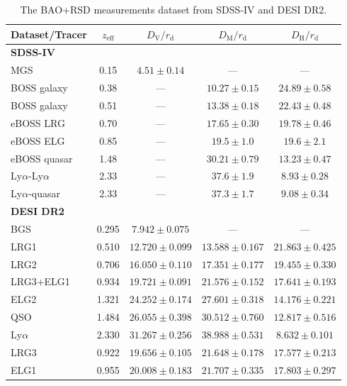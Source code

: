 \documentclass[twocolumn]{aastex631}
\begin{document}
   \begin{table}
      \centering
      \begin{tabular}{l|cccc}
         \hline\hline
         Dataset/Tracer & $z_{\text{eff}}$ & $D_{\text{V}}/r_{\text{d}}$ & 
         $D_{\text{M}}/r_{\text{d}}$ & $D_{\text{H}}/r_{\text{d}}$ \\
         \hline
         \textbf{SDSS-IV} \\
         MGS & 0.15 & $4.51 \pm 0.14$ & --- & --- \\
         BOSS galaxy & 0.38 & --- & $10.27 \pm 0.15$ & $24.89 \pm 0.58$ \\
         BOSS galaxy & 0.51 & --- & $13.38 \pm 0.18$ & $22.43 \pm 0.48$ \\
         eBOSS LRG & 0.70 & --- & $17.65 \pm 0.30$ & $19.78 \pm 0.46$ \\
         eBOSS ELG & 0.85 & --- & $19.5 \pm 1.0$ & $19.6 \pm 2.1$ \\
         eBOSS quasar& 1.48 & --- & $30.21 \pm 0.79$ & $13.23 \pm 0.47$ \\
         Ly$\alpha$-Ly$\alpha$ & 2.33 & --- & $37.6 \pm 1.9$ & $8.93 \pm 0.28$ \\
         Ly$\alpha$-quasar & 2.33 & --- & $37.3 \pm 1.7$ & $9.08 \pm 0.34$ \\
         \hline\hline
         \textbf{DESI DR2} \\ 
         BGS & 0.295 & $7.942 \pm 0.075$  & --- & --- \\
         LRG1 & 0.510 & $12.720 \pm 0.099$ & $13.588 \pm 0.167$ & $21.863 \pm 0.425$ \\
         LRG2 & 0.706 & $16.050 \pm 0.110$ & $17.351 \pm 0.177$ & $19.455 \pm 0.330$ \\
         LRG3+ELG1 & 0.934 & $19.721 \pm 0.091$ & $21.576 \pm 0.152$ & $17.641 \pm 0.193$ \\
         ELG2 & 1.321 & $24.252 \pm 0.174$ & $27.601 \pm 0.318$ & $14.176 \pm 0.221$ \\
         QSO & 1.484 & $26.055 \pm 0.398$ & $30.512 \pm 0.760$ & $12.817 \pm 0.516$ \\
         Ly$\alpha$ & 2.330 & $31.267 \pm 0.256$ & $38.988 \pm 0.531$ & $8.632 \pm 0.101$ \\
         \hline
         LRG3 & 0.922 & $19.656 \pm 0.105$ & $21.648 \pm 0.178$ & $17.577 \pm 0.213$ \\
         ELG1 & 0.955 & $20.008 \pm 0.183$ & $21.707 \pm 0.335$ & $17.803 \pm 0.297$ \\    
         \hline\hline
      \end{tabular}
      \caption{
         The BAO+RSD measurements dataset from SDSS-IV and DESI DR2.
      }
      \label{tab:2}
   \end{table}
\end{document}
